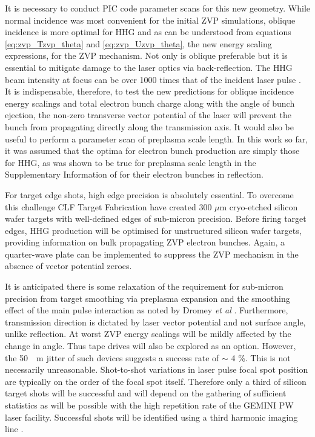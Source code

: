 It is necessary to conduct PIC code parameter scans for this new geometry. While normal incidence was most convenient for the initial ZVP simulations, oblique incidence is more optimal for \ac{HHG} \cite{gonoskovUltrarelativisticNanoplasmonicsRoute2011, edwardsXRayEmissionEffectiveness2020} and as can be understood from equations \ref{eq:zvp_Tzvp_theta} and \ref{eq:zvp_Uzvp_theta}, the new energy scaling expressions, for the ZVP mechanism. Not only is oblique preferable but it is essential to mitigate damage to the laser optics via back-reflection. The \ac{HHG} beam intensity at focus can be over 1000 times that of the incident laser pulse \cite{quereReflectingPetawattLasers2021}. It is indispensable, therefore, to test the new predictions for oblique incidence energy scalings and total electron bunch charge along with the angle of bunch ejection, the non-zero transverse vector potential of the laser will prevent the bunch from propagating directly along the transmission axis. It would also be useful to perform a parameter scan of preplasma scale length. In this work so far, it was assumed that the optima for electron bunch production are simply those for \ac{HHG}, as was shown to be true for preplasma scale length in the Supplementary Information of \cite{thevenetVacuumLaserAcceleration2016} for their electron bunches in reflection.

For target edge shots, high edge precision is absolutely essential. To overcome this challenge CLF Target Fabrication have created 300 $\mu$m cryo-etched silicon wafer targets with well-defined edges of sub-micron precision. Before firing target edges, HHG production will be optimised for unstructured silicon wafer targets, providing information on bulk propagating ZVP electron bunches. Again, a quarter-wave plate can be implemented to suppress the ZVP mechanism in the absence of vector potential zeroes.

It is anticipated there is some relaxation of the requirement for sub-micron precision from target smoothing via preplasma expansion and the smoothing effect of the main pulse interaction as noted by Dromey \textit{et al} \cite{dromeyDiffractionlimitedPerformanceFocusing2009}. Furthermore, transmission direction is dictated by laser vector potential and not surface angle, unlike reflection. At worst ZVP energy scalings will be mildly affected by the change in angle. Thus tape drives will also be explored as an option. However, the \qty{50}{\mu m} jitter of such devices suggests a success rate of $\sim$ 4 \%. This is not necessarily unreasonable. Shot-to-shot variations in laser pulse focal spot position are typically on the order of the focal spot itself. Therefore only a third of silicon target shots will be successful and will depend on the gathering of sufficient statistics as will be possible with the high repetition rate of the GEMINI PW laser facility. Successful shots will be identified using a third harmonic imaging line \cite{dromeyDiffractionlimitedPerformanceFocusing2009}. 

